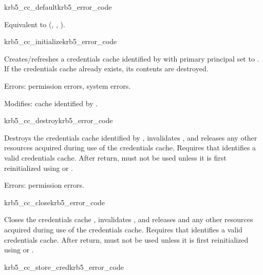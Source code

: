 \begin{funcdecl}{krb5_cc_default}{krb5_error_code}{\funcinout}
\funcout
{}
\end{funcdecl}

Equivalent to
(,
,
).

\begin{funcdecl}{krb5_cc_initialize}{krb5_error_code}{\funcinout}
\funcin
{}
\end{funcdecl}

Creates/refreshes a credentials cache identified by  with
primary principal set to .
If the credentials cache already exists, its contents are destroyed.

Errors:  permission errors, system errors.

Modifies: cache identified by .

\begin{funcdecl}{krb5_cc_destroy}{krb5_error_code}{\funcinout}
\end{funcdecl}

Destroys the credentials cache identified by , invalidates
, and releases any other resources acquired during use of
the credentials cache.  Requires that  identifies a valid
credentials cache.  After return,  must not be used unless
it is first reinitialized using  or
.

Errors:  permission errors.

\begin{funcdecl}{krb5_cc_close}{krb5_error_code}{\funcinout}
\end{funcdecl}

Closes the credentials cache , invalidates
, and releases  and any other resources
acquired during use of the credentials cache.  Requires that
 identifies a valid credentials cache.  After return,
 must not be used unless it is first reinitialized using
 or .


\begin{funcdecl}{krb5_cc_store_cred}{krb5_error_code}{\funcinout}
\funcin
{}
\end{funcdecl}

